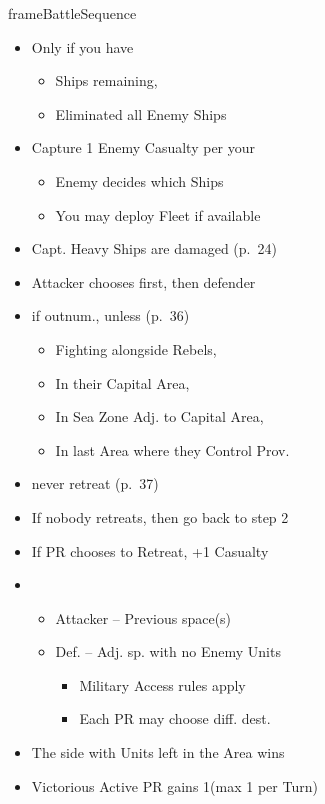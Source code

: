 \documentclass[10pt]{article}
\newlength{\fhBattleSequence} \setlength\fhBattleSequence{31\baselineskip}
\begin{document}
\begin{dynamiccontents*}{frameBattleSequence}
\begin{eubox}{\fhBattleSequence}
\begin{multicols}{3}
\begin{itemize}
		\end{itemize}
		\begin{itemize}
			\item Only if you have
			\begin{itemize}
				\item Ships remaining, 
				\item Eliminated all Enemy Ships
			\end{itemize}
			\item Capture 1 Enemy Casualty per your \tercios
			\begin{itemize}
				\item Enemy decides which Ships 
				\item You may deploy Fleet if available
			\end{itemize}
			\item Capt. Heavy Ships are damaged (p.~24)
		\end{itemize}
		\begin{itemize}
			\item Attacker chooses first, then defender
			\item {} if outnum., unless (p.~36)
			\begin{itemize}
				\item Fighting alongside Rebels, 
				\item In their Capital Area, 
				\item In Sea Zone Adj. to Capital Area, 
				\item In last Area where they Control Prov.
			\end{itemize}
			\item {} never retreat (p.~37)
			\item If nobody retreats, then go back to step 2
			\item If PR chooses to Retreat, +1 Casualty
			\item {}
			\begin{itemize}
				\item Attacker -- Previous space(s)
				\item Def. -- Adj. sp. with no Enemy Units
				\begin{itemize}
					\item Military Access rules apply
					\item Each PR may choose diff. dest.
				\end{itemize}
			\end{itemize}
		\end{itemize}
		\begin{itemize}
			\item The side with Units left in the Area wins
			\item Victorious Active PR gains 1\milpower (max 1 per Turn)
		\end{itemize}
	\end{multicols}
\end{eubox}\end{dynamiccontents*}
\end{document}
